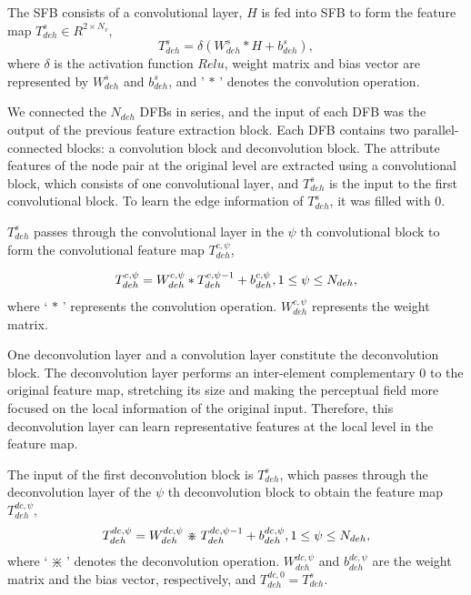 \documentclass[journal,twoside,web]{ieeecolor}
\begin{document}
The SFB consists of a convolutional layer, $H$ is fed into SFB to form the feature map $T_{deh}^s \in {R^{2 \times {N_v}}}$,
\begin{equation}
T_{deh}^s = \delta \left( {W_{deh}^s * H + b_{deh}^s} \right),\end{equation}
where $\delta $ is the activation function $Relu$, weight matrix and bias vector are represented by $W_{deh}^s$ and $b_{deh}^s$, and ' $ * $ ' denotes the convolution operation.

We connected the ${N_{deh}}$ DFBs in series, and the input of each DFB was the output of the previous feature extraction block. Each DFB contains two parallel-connected blocks: a convolution block and deconvolution block. The attribute features of the node pair at the original level are extracted using a convolutional block, which consists of one convolutional layer, and $T_{deh}^s$ is the input to the first convolutional block. To learn the edge information of $T_{deh}^s$, it was filled with 0. 

$T_{deh}^s$ passes through the convolutional layer in the $\psi $ th convolutional block to form the convolutional feature map $T_{deh}^{c,\psi }$,

\begin{equation}
T_{deh}^{c,\psi } = W_{deh}^{c,\psi } * T_{deh}^{c,\psi  - 1} + b_{deh}^{c,\psi },{\rm{ 1}} \le \psi  \le {N_{deh}},
\end{equation}
where ` $ * $ ' represents the convolution operation. $W_{deh}^{c,\psi }$ represents the weight matrix.

One deconvolution layer and a convolution layer constitute the deconvolution block. The deconvolution layer performs an inter-element complementary 0 to the original feature map, stretching its size and making the perceptual field more focused on the local information of the original input. Therefore, this deconvolution layer can learn representative features at the local level in the feature map.

The input of the first deconvolution block is $T_{deh}^s$, which passes through the deconvolution layer of the $\psi $ th deconvolution block to obtain the feature map $T_{deh}^{dc,\psi }$,
\begin{equation}
T_{deh}^{dc,\psi } = W_{deh}^{dc,\psi } \mathrel{\setbox0=\hbox{$\times$}
\rlap{\hbox to\wd0{\hss$\div$\hss}}\box0} T_{deh}^{dc,\psi  - 1} + b_{deh}^{dc,\psi },{\rm{1}} \le \psi  \le {N_{deh}},
\end{equation}
where ` $\divideontimes $ ' denotes the deconvolution operation. $W_{deh}^{dc,\psi }$ and $b_{deh}^{dc,\psi }$ are the weight matrix and the bias vector, respectively, and $T_{deh}^{dc,0} = T_{deh}^s$. 
\end{document}
